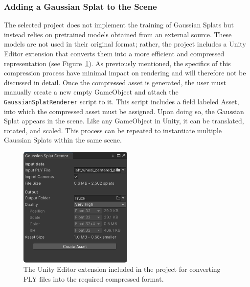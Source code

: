 \documentclass[12pt]{article}
\begin{document}
\subsubsection{Adding a Gaussian Splat to the Scene}
The selected project does not implement the training of Gaussian Splats but instead relies on pretrained models obtained from an external source. These models are not used in their original format; rather, the project includes a Unity Editor extension that converts them into a more efficient and compressed representation (see Figure~\ref{fig:creator}). As previously mentioned, the specifics of this compression process have minimal impact on rendering and will therefore not be discussed in detail. Once the compressed asset is generated, the user must manually create a new empty GameObject and attach the \texttt{GaussianSplatRenderer} script to it. This script includes a field labeled Asset, into which the compressed asset must be assigned. Upon doing so, the Gaussian Splat appears in the scene. Like any GameObject in Unity, it can be translated, rotated, and scaled. This process can be repeated to instantiate multiple Gaussian Splats within the same scene.
\begin{figure}[h!]
	\centering
	\includegraphics[width=0.5\textwidth]{Images/SplatCreator.png}
	\caption{The Unity Editor extension included in the project for converting PLY files into the required compressed format.}
	\label{fig:creator}
\end{figure}
\end{document}
